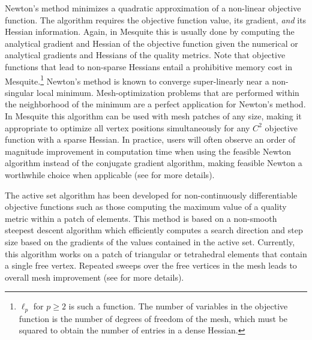 \documentclass[psfig]{article}
\begin{document}
\newpage
{} \newline
\label{append_B}
Newton's method minimizes a quadratic
approximation of a non-linear objective function. The algorithm requires
the objective function value, its gradient, \emph{and} its Hessian information.
Again, in Mesquite this
is usually done by computing the analytical gradient and Hessian of
the objective function given the numerical or analytical gradients and
Hessians of the quality metrics.  Note that objective functions that
lead to non-sparse Hessians entail a prohibitive memory cost in
Mesquite.\footnote{$\ell_p$ for $p \geq 2$ is such a function. The
number of variables in the objective function is the number of degrees
of freedom of the mesh, which must be squared to obtain the number of
entries in a dense Hessian.}  Newton's method is known to converge
super-linearly near a non-singular local minimum.   
Mesh-optimization problems that are performed within the neighborhood of
the minimum are a perfect application for Newton's method. In
Mesquite this algorithm can be used with mesh patches of any size,
making it appropriate to optimize all vertex positions simultaneously
for any $C^2$ objective function with a sparse Hessian.  In practice,
users will often observe an order of magnitude improvement in
computation time when using the feasible Newton algorithm instead of
the conjugate gradient algorithm, making feasible Newton a worthwhile
choice when applicable (see \cite{FeasNewt} for more details).

\newpage
{} \newline
\label{append_C}
The active set algorithm has been
developed for non-continuously differentiable objective functions such
as those computing the maximum value of a quality metric within a
patch of elements. This method is based on a non-smooth steepest
descent algorithm which efficiently computes a search direction and
step size based on the gradients of the values contained in the active
set.  Currently, this algorithm works on a patch of triangular or 
tetrahedral elements that 
contain a single free vertex.  Repeated
sweeps over the free vertices in the mesh leads to overall mesh
improvement (see \cite{fp:ijnme00} for more details).
\end{document}
